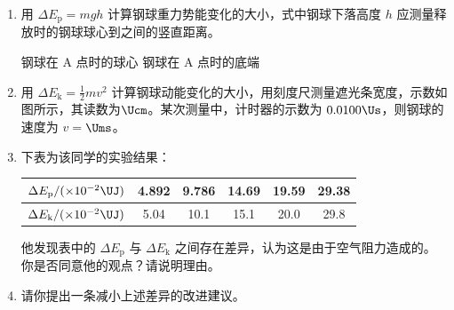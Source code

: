 \documentclass[\gkver]{gaokaozhenti}
\begin{document}
\begin{enumerate}
\begin{enumerate}
	\item
	用 $\Delta E_{\mathrm{p}}=mgh$ 计算钢球重力势能变化的大小，式中钢球下落高度 $h$ 应测量释放时的钢球球心到之间的竖直距离。

	{钢球在 A 点时的球心}
	{钢球在 A 点时的底端}
	\item
	用 $\Delta E_{\mathrm{k}}=\frac{1}{2}mv^{2}$ 计算钢球动能变化的大小，用刻度尺测量遮光条宽度，示数如图所示，其读数为$\Ucm$。某次测量中，计时器的示数为 $0.0100\Us$，则钢球的速度为 $v=$$\Ums$。

	\item
	下表为该同学的实验结果：

	\begin{center}
	\begin{tabular}{|c|c|c|c|c|c|}
	\hline
	$\Delta E_{\mathrm{p}}/(\times10^{-2}\UJ)$ & 4.892 & 9.786 & 14.69 & 19.59 & 29.38 \\
	\hline
	$\Delta E_{\mathrm{k}}/(\times10^{-2}\UJ)$ & 5.04 & 10.1 & 15.1 & 20.0 & 29.8 \\
	\hline
	\end{tabular}
	\end{center}

	他发现表中的 $\Delta E_{\mathrm{p}}$ 与 $\Delta E_{\mathrm{k}}$ 之间存在差异，认为这是由于空气阻力造成的。你是否同意他的观点？请说明理由。
	\item
	请你提出一条减小上述差异的改进建议。
\end{enumerate}
\end{enumerate}
\end{document}
